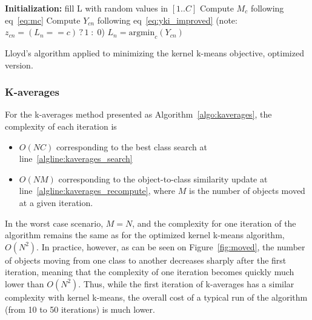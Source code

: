 \documentclass[10pt,journal,compsoc]{IEEEtran}
\begin{document}
\begin{algorithm}
	\label{algo:kkmeans_optim}
	\SetAlgoLined
	\BlankLine	
	\textbf{Initialization:}
	fill L with random values in $[1..C]$\;
	\BlankLine	
	 {
	     {
	        Compute $M_c$ following eq~\ref{eq:mc} \label{algline:kkmeans_imp_mc}
	    }
		 {
			 {
				Compute $Y_{cn}$ following eq~\ref{eq:yki_improved} \label{algline:kkmeans_imp_cplx1}
				(note: $z_{cn} = (L_n == c)\,?\,1\;:\;0$)
			}
			$L_n = \textrm{argmin}_c (Y_{cn})$\;
		}
	}
	\BlankLine
	\caption{Lloyd's algorithm applied to minimizing the kernel k-means objective, optimized version.}
\end{algorithm}


\subsubsection{K-averages}

For the k-averages method presented as Algorithm~\ref{algo:kaverages}, the complexity of each iteration is
\begin{itemize}
\item $O(NC)$ corresponding to the best class search at line~\ref{algline:kaverages_search}
\item  $O(NM)$ corresponding to the object-to-class similarity update at line~\ref{algline:kaverages_recompute}, where $M$ is the number of objects moved at a given iteration.
\end{itemize}

In the worst case scenario, $M = N$, and the complexity for one iteration of the algorithm remains the same as for the optimized kernel k-means algorithm, $O(N^2)$. In practice, however, as can be seen on Figure~\ref{fig:moved}, the number of objects moving from one class to another decreases sharply after the first iteration, meaning that the complexity of one iteration becomes quickly much lower than $O(N^2)$. Thus, while the first iteration of k-averages has a similar complexity with kernel k-means, the overall cost of a typical run of the algorithm (from 10 to 50 iterations) is much lower.
\end{document}
